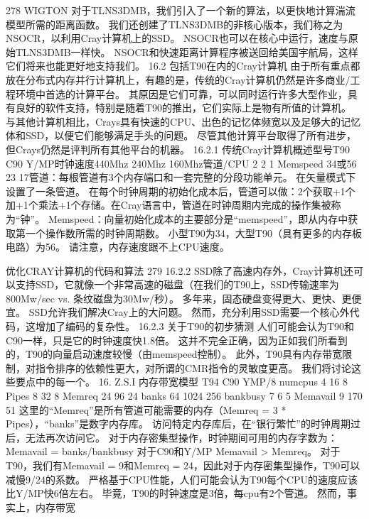 \documentclass[UTF8,11pt,a4paper,openany,fontset=fandol]{ctexbook}
\begin{document}
278 WIGTON 对于TLNS3DMB，我们引入了一个新的算法，以更快地计算湍流模型所需的距离函数。 我们还创建了TLNS3DMB的非核心版本，我们称之为NSOCR，以利用Cray计算机上的SSD。 NSOCR也可以在核心中运行，速度与原始TLNS3DMB一样快。 NSOCR和快速距离计算程序被送回给美国宇航局，这样它们将来也能更好地支持我们。 16.2 包括T90在内的Cray计算机 由于所有重点都放在分布式内存并行计算机上，有趣的是，传统的Cray计算机仍然是许多商业/工程环境中首选的计算平台。 其原因是它们可靠，可以同时运行许多大型作业，具有良好的软件支持，特别是随着T90的推出，它们实际上是物有所值的计算机。 与其他计算机相比，Crays具有快速的CPU、出色的记忆体频宽以及足够大的记忆体和SSD，以便它们能够满足手头的问题。 尽管其他计算平台取得了所有进步，但Crays仍然是评判所有其他平台的机器。 16.2.1 传统Cray计算机概述型号T90 C90 Y/MP时钟速度440Mhz 240Mhz 160Mhz管道/CPU 2 2 1 Memspeed 34或56 23 17管道：每根管道有3个内存端口和一套完整的分段功能单元。 在矢量模式下设置了一条管道。 在每个时钟周期的初始化成本后，管道可以做：2个获取+1个加+1个乘法+1个存储。在Cray语言中，管道在时钟周期内完成的操作集被称为“钟”。 Memspeed：向量初始化成本的主要部分是“memspeed”，即从内存中获取第一个操作数所需的时钟周期数。 小型T90为34，大型T90（具有更多的内存板电路）为56。 请注意，内存速度跟不上CPU速度。

优化CRAY计算机的代码和算法 279 16.2.2 SSD除了高速内存外，Cray计算机还可以支持SSD，它就像一个非常高速的磁盘（在我们的T90上，SSD传输速率为800Mw/sec vs. 条纹磁盘为30Mw/秒）。 多年来，固态硬盘变得更大、更快、更便宜。 SSD允许我们解决Cray上的大问题。 然而，充分利用SSD需要一个核心外代码，这增加了编码的复杂性。 16.2.3 关于T90的初步猜测 人们可能会认为T90和C90一样，只是它的时钟速度快1.8倍。 这并不完全正确，因为正如我们所看到的，T90的向量启动速度较慢（由memspeed控制）。 此外，T90具有内存带宽限制，对指令排序的依赖性更大，对所谓的CMR指令的灵敏度更高。 我们将讨论这些要点中的每一个。 16. Z.S.I 内存带宽模型 T94 C90 YMP/8 numcpus 4 16 8 Pipes 8 32 8 Memreq 24 96 24 banks 64 1024 256 bankbusy 7 6 5 Memavail 9 170 51 这里的“Memreq”是所有管道可能需要的内存（Memreq = 3 * Pipes），“banks”是数字内存库。 访问特定内存库后，在“银行繁忙”的时钟周期过后，无法再次访问它。 对于内存密集型操作，时钟期间可用的内存字数为：Memavail = banks/bankbusy 对于C90和Y/MP Memavail > Memreq。 对于T90，我们有Memavail = 9和Memreq = 24，因此对于内存密集型操作，T90可以减慢9/24的系数。 严格基于CPU性能，人们可能会认为T90每个CPU的速度应该比Y/MP快6倍左右。 毕竟，T90的时钟速度是3倍，每cpu有2个管道。 然而，事实上，内存带宽
\end{document}
